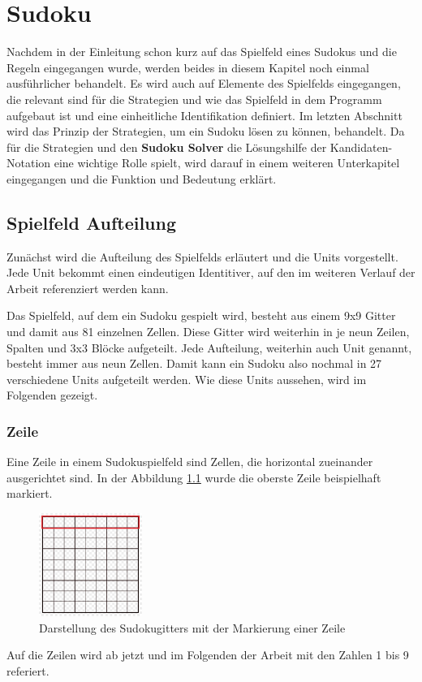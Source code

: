 

\chapter{Sudoku}
Nachdem in der Einleitung schon kurz auf das Spielfeld eines Sudokus und die Regeln eingegangen wurde, werden beides in diesem Kapitel noch einmal ausführlicher behandelt. Es wird auch auf Elemente des Spielfelds eingegangen, die relevant sind für die Strategien und wie das Spielfeld in dem Programm aufgebaut ist und eine einheitliche Identifikation definiert. Im letzten Abschnitt wird das Prinzip der Strategien, um ein Sudoku lösen zu können, behandelt. Da für die Strategien und den \textbf{Sudoku Solver} die Lösungshilfe der Kandidaten-Notation eine wichtige Rolle spielt, wird darauf in einem weiteren Unterkapitel eingegangen und die Funktion und Bedeutung erklärt.



\section{Spielfeld Aufteilung}
Zunächst wird die Aufteilung des Spielfelds erläutert und die Units vorgestellt. Jede Unit bekommt einen eindeutigen Identitiver, auf den im weiteren Verlauf der Arbeit referenziert werden kann.

Das Spielfeld, auf dem ein Sudoku gespielt wird, besteht aus einem 9x9 Gitter und damit aus 81 einzelnen Zellen. Diese Gitter wird weiterhin in je neun Zeilen, Spalten und 3x3 Blöcke aufgeteilt. Jede Aufteilung, weiterhin auch Unit genannt, besteht immer aus neun Zellen. Damit kann ein Sudoku also nochmal in 27 verschiedene Units aufgeteilt werden. Wie diese Units aussehen, wird im Folgenden gezeigt.

\subsection{Zeile}
Eine Zeile in einem Sudokuspielfeld sind Zellen, die horizontal zueinander ausgerichtet sind. In der Abbildung \ref{fig:SudokugitterZeile} wurde die oberste Zeile beispielhaft markiert.
\begin{figure}[htbp]
	\centering
	\includegraphics[width=0.3\textwidth]{images/sudokugitterZeile.jpg}
	\caption{Darstellung des Sudokugitters mit der Markierung einer Zeile}
	\label{fig:SudokugitterZeile}
\end{figure}
Auf die Zeilen wird ab jetzt und im Folgenden der Arbeit mit den Zahlen 1 bis 9 referiert. 

